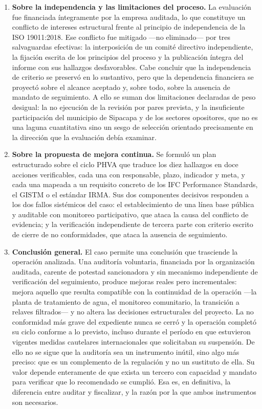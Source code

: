 \begin{enumerate}
\item \textbf{Sobre la independencia y las limitaciones del proceso.} La
evaluación fue financiada íntegramente por la empresa auditada, lo que constituye
un conflicto de intereses estructural frente al principio de independencia de la
ISO 19011:2018. Ese conflicto fue mitigado —no eliminado— por tres salvaguardas
efectivas: la interposición de un comité directivo independiente, la fijación
escrita de los principios del proceso y la publicación íntegra del informe con sus
hallazgos desfavorables. Cabe concluir que la independencia de criterio se
preservó en lo sustantivo, pero que la dependencia financiera se proyectó sobre el
alcance aceptado y, sobre todo, sobre la ausencia de mandato de seguimiento. A
ello se suman dos limitaciones declaradas de peso desigual: la no ejecución de la
revisión por pares prevista, y la insuficiente participación del municipio de
Sipacapa y de los sectores opositores, que no es una laguna cuantitativa sino un
sesgo de selección orientado precisamente en la dirección que la evaluación debía
examinar.

\item \textbf{Sobre la propuesta de mejora continua.} Se formuló un plan
estructurado sobre el ciclo PHVA que traduce los diez hallazgos en doce acciones
verificables, cada una con responsable, plazo, indicador y meta, y cada una
mapeada a un requisito concreto de los IFC Performance Standards, el GISTM o el
estándar IRMA. Sus dos componentes decisivos responden a los dos fallos
sistémicos del caso: el establecimiento de una línea base pública y auditable con
monitoreo participativo, que ataca la causa del conflicto de evidencia; y la
verificación independiente de tercera parte con criterio escrito de cierre de no
conformidades, que ataca la ausencia de seguimiento.

\item \textbf{Conclusión general.} El caso permite una conclusión que trasciende
la operación analizada. Una auditoría voluntaria, financiada por la organización
auditada, carente de potestad sancionadora y sin mecanismo independiente de
verificación del seguimiento, produce mejoras reales pero incrementales: mejora
aquello que resulta compatible con la continuidad de la operación —la planta de
tratamiento de agua, el monitoreo comunitario, la transición a relaves filtrados—
y no altera las decisiones estructurales del proyecto. La no conformidad más
grave del expediente nunca se cerró y la operación completó su ciclo conforme a lo
previsto, incluso durante el período en que estuvieron vigentes medidas
cautelares internacionales que solicitaban su suspensión. De ello no se sigue que
la auditoría sea un instrumento inútil, sino algo más preciso: que es un
complemento de la regulación y no un sustituto de ella. Su valor depende
enteramente de que exista un tercero con capacidad y mandato para verificar que lo
recomendado se cumplió. Esa es, en definitiva, la diferencia entre auditar y
fiscalizar, y la razón por la que ambos instrumentos son necesarios.

\end{enumerate}

